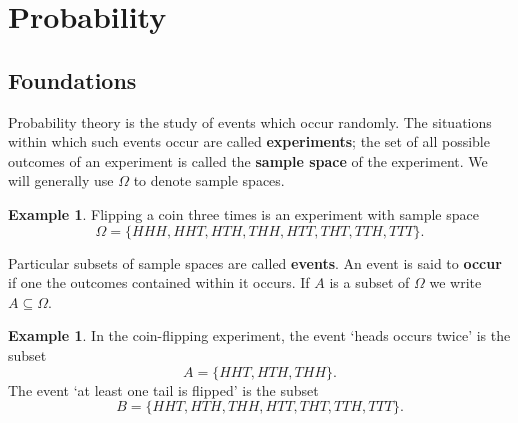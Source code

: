 \documentclass[a4paper,leqno]{article}
\numberwithin{equation}{section}
\theoremstyle{definition}
\newtheorem{ex}[equation]{Example}
\theoremstyle{remark}
\newcommand{\df}{\textbf}
\begin{document}
\section{Probability}
\subsection{Foundations}
Probability theory is the study of events which occur randomly. The situations within which such events occur are called \df{experiments}; the set
of all possible outcomes of an experiment is called the \df{sample space} of the experiment. We will generally use $ \Omega $ to denote sample
spaces.

\begin{ex}
  Flipping a coin three times is an experiment with sample space
  \begin{displaymath}
    \Omega = \{HHH, HHT, HTH, THH, HTT, THT, TTH, TTT\}.
  \end{displaymath}
\end{ex}

Particular subsets of sample spaces are called \df{events}. An event is said to \df{occur} if
one the outcomes contained within it occurs. If $ A $ is a subset of $ \Omega $ we write $ A \subseteq \Omega $.

\begin{ex}
  In the coin-flipping experiment, the event `heads occurs twice' is the subset
  \begin{displaymath}
    A = \{HHT, HTH, THH\}.
  \end{displaymath}
  The event `at least one tail is flipped' is the subset
  \begin{displaymath}
    B = \{HHT, HTH, THH, HTT, THT, TTH, TTT\}.
  \end{displaymath}
\end{ex}
\end{document}

